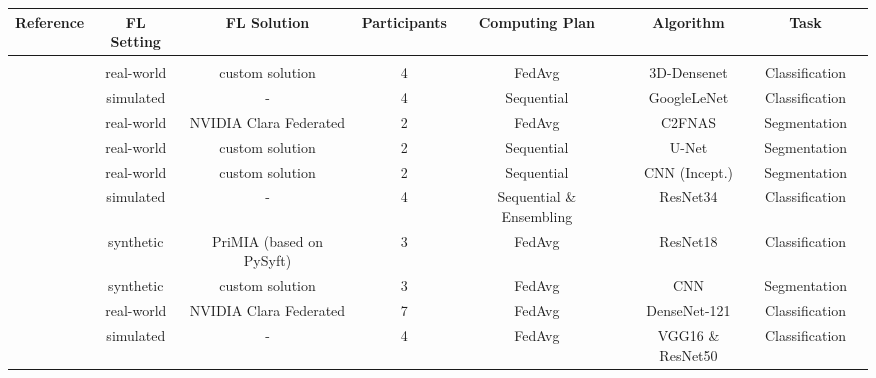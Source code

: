 \begin{table}[h!]
\begin{adjustbox}{width=1\textwidth}
  \centering
  \begin{tabular}{cccccccc}
    Reference & FL Setting & FL Solution & Participants & Computing Plan & Algorithm & Task \\
    \hline \\[-2.5ex] %
    \cite{Xu2020ADiagnosis}                             & real-world & custom solution          & 4             & FedAvg                    & 3D-Densenet       & Classification \\
    \cite{Balachandar2020AccountingImaging}             & simulated  & -                        & 4             & Sequential                & GoogleLeNet       & Classification \\
    \cite{Wang2020AutomatedLearning}                    & real-world & NVIDIA Clara Federated   & 2             & FedAvg                    & C2FNAS            & Segmentation \\
    \cite{Remedios2020DistributedSegmentation}          & real-world & custom solution          & 2             & Sequential                & U-Net             & Segmentation  \\
    \cite{Remedios2019DistributedInjury}                & real-world & custom solution          & 2             & Sequential                & CNN (Incept.)     & Segmentation  \\
    \cite{Chang2018DistributedImaging}                  & simulated  & -                        & 4             & Sequential \& Ensembling  & ResNet34          & Classification \\
    \cite{Kaissis2021End-to-endImaging}                 & synthetic  & PriMIA (based on PySyft) & 3             & FedAvg                    & ResNet18          & Classification  \\
    \cite{Dou2021FederatedStudy}                        & synthetic  & custom solution          & 3             & FedAvg                    & CNN               & Segmentation \\
    \cite{Roth2020FederatedImplementation}              & real-world & NVIDIA Clara Federated   & 7             & FedAvg                    & DenseNet-121      & Classification \\
    \cite{Feki2021FederatedImages}                      & simulated  & -                        & 4             & FedAvg                    & VGG16 \& ResNet50 & Classification \\    

\end{tabular}
\end{adjustbox}
\end{table}
